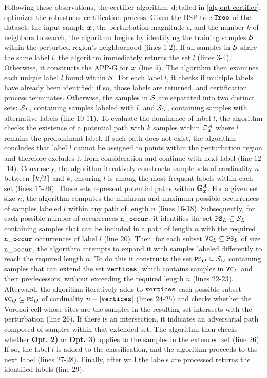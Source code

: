 Following these observations, the certifier algorithm, detailed in \autoref{alg:opt-certifier}, optimizes the robustness certification process. Given the BSP tree $\var{Tree}$ of the dataset, the input sample $\vinput$, the perturbation magnitude $\epsilon$, and the number $k$ of neighbors to search, the algorithm begins by identifying the training samples $\set$ within the perturbed region's neighborhood (lines $1$-$2$). If all samples in $\set$ share the same label $l$, the algorithm immediately returns the set $l$ (lines $3$-$4$). Otherwise, it constructs the \acs{APP-G} for $\vinput$ (line $5$). The algorithm then examines each unique label $l$ found within $\set$. For each label $l$, it checks if multiple labels have already been identified; if so, those labels are returned, and certification process terminates. Otherwise, the samples in $\set$ are separated into two distinct sets: $\set_L$, containing samples labeled with $l$, and $\set_O$, containing samples with alternative labels (line $10$-$11$). To evaluate the dominance of label $l$, the algorithm checks the existence of a potential path with $k$ samples within $\APPG$ where $l$ remains the predominant label. If such path does not exist, the algorithm concludes that label $l$ cannot be assigned to points within the perturbation region and therefore excludes it from consideration and continue with next label (line $12$-$14$). Conversely, the algorithm iteratively constructs sample sets of cardinality $n$ between $\ceil*{k/2}$ and $k$, ensuring $l$ is among the most frequent labels within each set (lines $15$-$28$). These sets represent potential paths within $\APPG$. For a given set size $n$, the algorithm computes the minimum and maximum possible occurrences of samples labeled $l$ within any path of length $n$ (lines $16$-$18$). Subsequently, for each possible number of occurrences $\var{n\_occur}$, it identifies the set $\var{PS}_L \subseteq \set_L$ containing samples that can be included in a path of length $n$ with the required $\var{n\_occur}$ occurrences of label $l$ (line 20). Then, for each subset $\var{VC}_L \subseteq \var{PS}_L$ of size $\var{n\_occur}$, the algorithm attempts to expand it with samples labeled differently to reach the required length $n$. To do this it constructs the set $\var{PS}_O \subseteq \set_O$ containing samples that can extend the set $\var{vertices}$, which contains samples in $\var{VC}_L$ and their predecessors, without exceeding the required length $n$ (lines $22$-$23$). Afterward, the algorithm iteratively adds to $\var{vertices}$ each possible subset $\var{VC}_O \subseteq \var{PS}_O$ of cardinality $n - |\var{vertices}|$ (lines $24$-$25$) and checks whether the Voronoi cell whose sites are the samples in the resulting set intersects with the perturbation (line $26$). If there is an intersection, it indicates an adversarial path composed of samples within that extended set. The algorithm then checks whether \textbf{Opt. 2)} or \textbf{Opt. 3)} applies to the samples in the extended set (line $26$). If so, the label $l$ is added to the classification, and the algorithm proceeds to the next label (lines $27$-$28$).
Finally, after wall the labels are processed returns the identified labels (line $29$).

